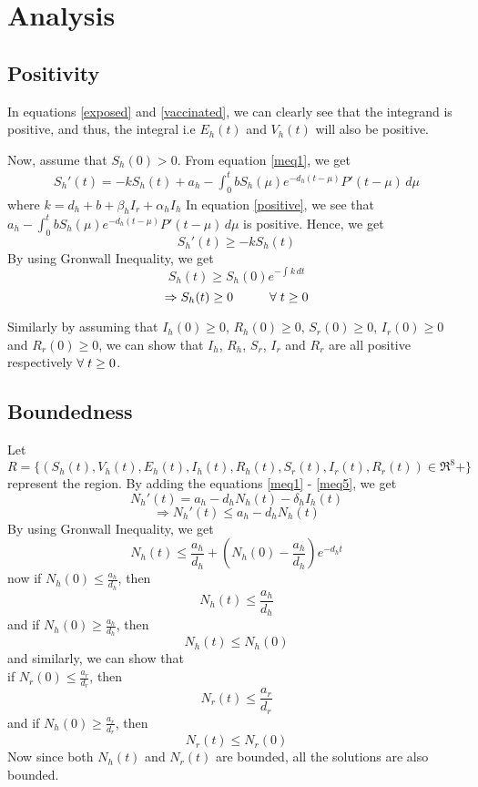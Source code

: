 \chapter{Analysis}

\section{Positivity}
In equations \ref{exposed} and \ref{vaccinated}, we can clearly see that the integrand is positive, and thus, the integral i.e $E_{h}(t)$ and $V_{h}(t)$ will also be positive.

Now, assume that $S_{h}(0)>0$. From equation \ref{meq1}, we get
\begin{align}
S_{h}'(t) = -kS_{h}(t)+a_{h}-\int_{0}^{t} bS_{h}(\mu)e^{-d_{h}(t-\mu)}P'(t-\mu) \,d\mu \label{positive}
\end{align}
where $ k = d_{h}+b+\beta_{h}I_{r}+\alpha_{h}I_{h} $
In equation \ref{positive}, we see that $a_{h}-\int_{0}^{t} bS_{h}(\mu)e^{-d_{h}(t-\mu)}P'(t-\mu) \,d\mu$ is positive. Hence, we get
\[S_{h}'(t)\geq-kS_{h}(t)\]
By using Gronwall Inequality, we get
\[S_{h}(t) \geq S_{h}(0)e^{-\int_{}^{} k \,dt}\]
\[\Rightarrow S_{h}(t) \geq 0 \hspace{10mm} \forall \hspace{1mm} t \geq 0\]

Similarly by assuming that $I_{h}(0) \geq 0$, $R_{h}(0) \geq 0$, $S_{r}(0) \geq 0$, $I_{r}(0) \geq 0$ and $R_{r}(0) \geq 0$, we can show that $I_{h}$, $R_{h}$, $S_{r}$, $I_{r}$ and $R_{r}$ are all positive respectively $\forall \hspace{1mm} t \geq 0$.

\section{Boundedness}
Let $R = \lbrace(S_{h}(t), V_{h}(t), E_{h}(t), I_{h}(t), R_{h}(t), S_{r}(t), I_{r}(t), R_{r}(t)) \in \Re^8+\rbrace$ represent the region. By adding the equations \ref{meq1} - \ref{meq5}, we get
\[N_{h}'(t) = a_{h}-d_{h}N_{h}(t)-\delta_{h}I_{h}(t)\]
\[\Rightarrow N_{h}'(t) \leq a_{h}-d_{h}N_{h}(t)\]
By using Gronwall Inequality, we get
\[N_{h}(t) \leq \frac{a_{h}}{d_{h}} + (N_{h}(0)-\frac{a_{h}}{d_{h}})e^{-d_{h}t}\]
now if $N_{h}(0) \leq \frac{a_{h}}{d_{h}}$, then
\[N_{h}(t) \leq \frac{a_{h}}{d_{h}}\]
and if $N_{h}(0) \geq \frac{a_{h}}{d_{h}}$, then
\[N_{h}(t) \leq N_{h}(0)\]
and similarly, we can show that\\
if $N_{r}(0) \leq \frac{a_{r}}{d_{r}}$, then
\[N_{r}(t) \leq \frac{a_{r}}{d_{r}}\]
and if $N_{h}(0) \geq \frac{a_{r}}{d_{r}}$, then
\[N_{r}(t) \leq N_{r}(0)\]
Now since both $N_{h}(t)$ and $N_{r}(t)$ are bounded, all the solutions are also bounded.

